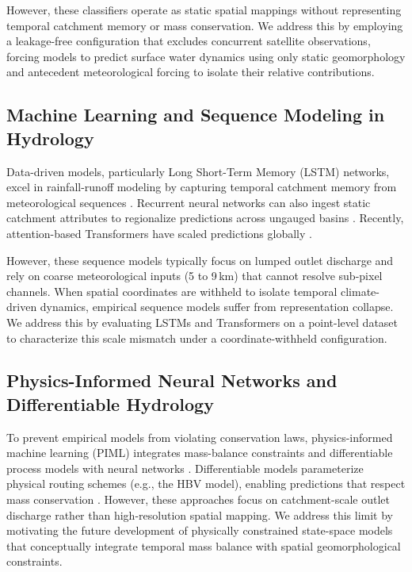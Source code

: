 \documentclass[12pt, a4paper]{article}
\begin{document}
However, these classifiers operate as static spatial mappings without representing temporal catchment memory or mass conservation. We address this by employing a leakage-free configuration that excludes concurrent satellite observations, forcing models to predict surface water dynamics using only static geomorphology and antecedent meteorological forcing to isolate their relative contributions.

\subsection{Machine Learning and Sequence Modeling in Hydrology}
Data-driven models, particularly Long Short-Term Memory (LSTM) networks, excel in rainfall-runoff modeling by capturing temporal catchment memory from meteorological sequences \citep{Kratzert2018, Sit2020A, Wünsch2021Groundwater}. Recurrent neural networks can also ingest static catchment attributes to regionalize predictions across ungauged basins \citep{Kratzert2019}. Recently, attention-based Transformers have scaled predictions globally \citep{Nearing2024Global, Feng2023The}.

However, these sequence models typically focus on lumped outlet discharge and rely on coarse meteorological inputs (5 to 9\,km) that cannot resolve sub-pixel channels. When spatial coordinates are withheld to isolate temporal climate-driven dynamics, empirical sequence models suffer from representation collapse. We address this by evaluating LSTMs and Transformers on a point-level dataset to characterize this scale mismatch under a coordinate-withheld configuration.

\subsection{Physics-Informed Neural Networks and Differentiable Hydrology}
To prevent empirical models from violating conservation laws, physics-informed machine learning (PIML) integrates mass-balance constraints and differentiable process models with neural networks \citep{Karniadakis2021Physicsinformed, Shen2023Differentiable}. Differentiable models parameterize physical routing schemes (e.g., the HBV model), enabling predictions that respect mass conservation \citep{Feng2023The, Zhao2022Evaporative, Li2020Toward}. However, these approaches focus on catchment-scale outlet discharge rather than high-resolution spatial mapping. We address this limit by motivating the future development of physically constrained state-space models that conceptually integrate temporal mass balance with spatial geomorphological constraints.
\end{document}
